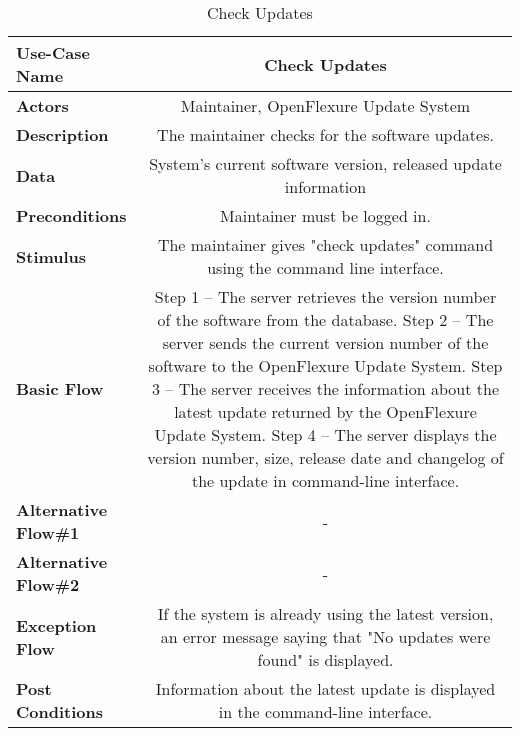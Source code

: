 \begin{table}[H]
     \centering
     \begin{tabular}{|l|C|}
         \hline
          \textbf{Use-Case Name} & Check Updates \\
         \hline
          \textbf{Actors} & Maintainer, OpenFlexure Update System \\ 
         \hline
          \textbf{Description} & The maintainer checks for the software updates.\\ 
         \hline
          \textbf{Data} & System's current software version, released update information\\
         \hline
          \textbf{Preconditions} & 
          Maintainer must be logged in. \\
         \hline
          \textbf{Stimulus} & The maintainer gives "check updates" command using the command line interface.\\ 
         \hline
          \textbf{Basic Flow} & 
          Step 1 -- The server retrieves the version number of the software from the database. \newline
          Step 2 -- The server sends the current version number of the software to the OpenFlexure Update System. \newline
          Step 3 -- The server receives the information about the latest update returned by the OpenFlexure Update System. \newline
          Step 4 -- The server displays the version number, size, release date and changelog of the update in command-line interface. \\
         \hline
          \textbf{Alternative Flow\#1} & - \\
         \hline
          \textbf{Alternative Flow\#2} & - \\
         \hline
          \textbf{Exception Flow} & If the system is already using the latest version, an error message saying that "No updates were found" is displayed. \\
         \hline
          \textbf{Post Conditions} & Information about the latest update is displayed in the command-line interface. \\ 
         \hline
     \end{tabular}
     \caption{Check Updates}
     \label{tab:check_updates}
 \end{table}